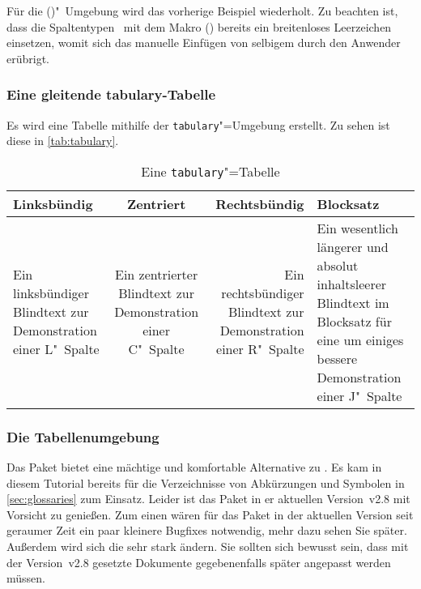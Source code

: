 \documentclass[%
  english,ngerman,%
  cdgeometry=no,DIV=12,%
  cd=false,cdfont=false,cdtitle=true,%
  headings=normal,%
  automark,%
  listof=toc,%
]{tudscrartcl}
\begin{document}
Für die ()"~Umgebung wird das vorherige 
Beispiel wiederholt. Zu beachten ist, dass die Spaltentypen~ mit 
dem Makro () bereits ein breitenloses 
Leerzeichen einsetzen, womit sich das manuelle Einfügen von selbigem durch den 
Anwender erübrigt.
%
\begin{Trunk+}
\subsubsection{Eine gleitende tabulary-Tabelle}
Es wird eine Tabelle mithilfe der \texttt{tabulary}"=Umgebung erstellt. 
Zu sehen ist diese in \autoref{tab:tabulary}. 

\end{Trunk+}
\begin{Trunk}
\begin{table}
\begin{tabulary}{\textwidth}{@{}LCRJ@{}}
\toprule
\textbf{Linksbündig} & \textbf{Zentriert} & 
\textbf{Rechtsbündig} & \textbf{Blocksatz} \tabularnewline\midrule
Ein linksbündiger Blindtext zur Demonstration einer L"~Spalte &
Ein zentrierter Blindtext zur Demonstration einer C"~Spalte &
Ein rechtsbündiger Blindtext zur Demonstration einer R"~Spalte &
Ein wesentlich längerer und absolut inhaltsleerer Blindtext im 
Blocksatz für eine um einiges bessere Demonstration einer J"~Spalte
\tabularnewline\bottomrule
\end{tabulary}
\caption{Eine \texttt{tabulary}"=Tabelle}\label{tab:tabulary}
\end{table}

\end{Trunk}
\InputCode


\subsubsection{Die Tabellenumgebung }
\label{sec:tabu}%
%
Das Paket  bietet eine mächtige und komfortable Alternative zu 
. Es kam in diesem Tutorial bereits für die Verzeichnisse von 
Abkürzungen und Symbolen in \autoref{sec:glossaries} zum Einsatz. Leider ist 
das Paket in er aktuellen Version~v2.8 mit Vorsicht zu genießen. Zum einen
wären für das Paket in der aktuellen Version seit geraumer Zeit ein paar 
kleinere Bugfixes notwendig, mehr dazu sehen Sie später. Außerdem wird sich die 
sehr stark ändern. Sie sollten sich bewusst sein, dass mit der Version~v2.8
gesetzte Dokumente gegebenenfalls später angepasst werden müssen.
\end{document}
